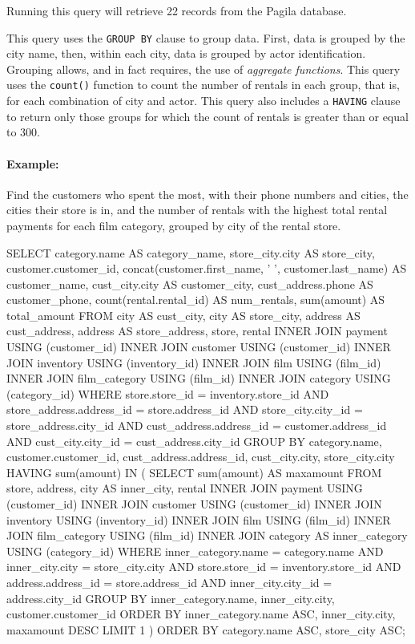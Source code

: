 Running this query will retrieve 22 records from the Pagila database.

This query uses the \texttt{GROUP BY} clause to group data. First, data is grouped by the city name, then, within each city, data is grouped by actor identification. Grouping allows, and in fact requires, the use of \emph{aggregate functions}. This query uses the \texttt{count()} function to count the number of rentals in each group, that is, for each combination of city and actor. This query also includes a \texttt{HAVING} clause to return only those groups for which the count of rentals is greater than or equal to 300. 

\paragraph*{Example:} Find the customers who spent the most, with their phone numbers and cities, the cities their store is in, and the number of rentals with the highest total rental payments for each film category, grouped by city of the rental store.

\begin{sqlcode}
SELECT category.name AS category_name, 
       store_city.city AS store_city,
       customer.customer_id, 
       concat(customer.first_name, ' ', 
           customer.last_name) AS customer_name,
       cust_city.city AS customer_city,
       cust_address.phone AS customer_phone,
       count(rental.rental_id) AS num_rentals,
       sum(amount) AS total_amount
 FROM city AS cust_city, city AS store_city, 
      address AS cust_address, address AS store_address, 
      store, rental
 INNER JOIN payment USING (customer_id)
 INNER JOIN customer USING (customer_id)
 INNER JOIN inventory USING (inventory_id)
 INNER JOIN film USING (film_id)
 INNER JOIN film_category USING (film_id)
 INNER JOIN category USING (category_id)
 WHERE store.store_id = inventory.store_id
   AND store_address.address_id = store.address_id
   AND store_city.city_id = store_address.city_id
   AND cust_address.address_id = customer.address_id
   AND cust_city.city_id = cust_address.city_id
 GROUP BY category.name, customer.customer_id, 
         cust_address.address_id, cust_city.city, store_city.city
 HAVING sum(amount) IN (
  SELECT sum(amount) AS maxamount
   FROM store, address, city AS inner_city, rental
   INNER JOIN payment USING (customer_id)
   INNER JOIN customer USING (customer_id)
   INNER JOIN inventory USING (inventory_id)
   INNER JOIN film USING (film_id)
   INNER JOIN film_category USING (film_id)
   INNER JOIN category AS inner_category USING (category_id)
   WHERE inner_category.name = category.name AND
         inner_city.city = store_city.city AND
         store.store_id = inventory.store_id AND
         address.address_id = store.address_id AND
         inner_city.city_id = address.city_id
   GROUP BY inner_category.name, inner_city.city, 
            customer.customer_id
   ORDER BY inner_category.name ASC, inner_city.city, 
            maxamount DESC
   LIMIT 1 )
 ORDER BY category.name ASC, store_city ASC;
\end{sqlcode}

